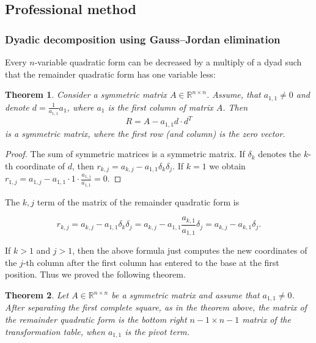 \documentclass[aspectratio=169,notheorems]{corvinusmetropolis}
\newtheorem{theorem}{Theorem}
\theoremstyle{definition}
\begin{document}
\subsection{Professional method}
\begin{frame}
    \frametitle{Dyadic decomposition using Gauss--Jordan elimination}
    Every $n$-variable quadratic form can be decreased by a multiply of a dyad such that
    the remainder quadratic form has one variable less:
    \begin{theorem}
        Consider a symmetric matrix $A\in\mathbb{R}^{n\times n}$.
        Assume, that $a_{1,1}\neq 0$ and denote $d=\frac{1}{a_{1,1}}a_1$,
        where $a_1$ is the first column of matrix $A$.
        Then 
        \[
            R=A-a_{1,1}d\cdot d^T
        \]
        is a symmetric matrix, where the first row (and column) is the zero vector.
    \end{theorem}
    \begin{proof}
        The sum of symmetric matrices is a symmetric matrix.
        If $\delta_k$ denotes the $k$-th coordinate of $d$, then
        \(
            r_{k,j}=
            a_{k,j}-a_{1,1}\delta_{k}\delta_j.
        \)
        If $k=1$ we obtain $r_{1,j}=a_{1,j}-a_{1,1}\cdot 1\cdot\frac{a_{1,j}}{a_{1,1}}=0$.
    \end{proof}
\end{frame}
\begin{frame}
    The $k,j$ term of the matrix of the remainder quadratic form is
    \begin{block}{}
    \[
        r_{k,j}=
        a_{k,j}-a_{1,1}\delta_k\delta_j=
        a_{k,j}-a_{1,1}\frac{a_{k,1}}{a_{1,1}}\delta_j=
        a_{k,j}-a_{k,1}\delta_j.
    \]
    \end{block}
    If $k>1$ and $j>1$, then the above formula just computes
    the new coordinates of the $j$-th column after the first column has entered to the base at the first position.
    Thus we proved the following theorem.
    \begin{theorem}
        Let $A\in\mathbb{R}^{n\times n}$ be a symmetric matrix and assume that $a_{1,1}\neq 0$.
        After separating the first complete square, as in the theorem above, the matrix of the remainder quadratic form
        is the bottom right $n-1\times n-1$ matrix of the transformation table, when $a_{1,1}$ is the pivot term.
    \end{theorem}
\end{frame}
\end{document}
